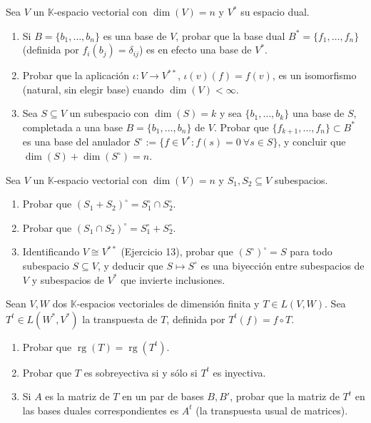 \documentclass{article}
\newcommand{\K}{\mathbb{K}}
\DeclareMathOperator{\rg}{rg}
\DeclareMathOperator{\dimm}{dim}
\theoremstyle{plain}
\theoremstyle{definition}
\theoremstyle{remark}
\newenvironment{ejercicio}[1]{\begin{trivlist}
\item[\hskip \labelsep {\bfseries Ejercicio}\hskip \labelsep {\bfseries #1.}]}{\end{trivlist}}
\begin{document}
\begin{ejercicio}{13}
    Sea \(V\) un \(\K\)-espacio vectorial con \(\dimm(V) = n\) y \(V^*\) su espacio dual.
    \begin{enumerate}
        \item Si \(B = \{b_1,\ldots,b_n\}\) es una base de \(V\), probar que la base dual \(B^* = \{f_1,\ldots,f_n\}\) (definida por \(f_i(b_j) = \delta_{ij}\)) es en efecto una base de \(V^*\).
        \item Probar que la aplicación \(\iota: V \to V^{**}\), \(\iota(v)(f) = f(v)\), es un isomorfismo (natural, sin elegir base) cuando \(\dimm(V) < \infty\).
        \item Sea \(S \subseteq V\) un subespacio con \(\dimm(S) = k\) y sea \(\{b_1,\ldots,b_k\}\) una base de \(S\), completada a una base \(B = \{b_1,\ldots,b_n\}\) de \(V\). Probar que \(\{f_{k+1},\ldots,f_n\} \subset B^*\) es una base del anulador \(S^\circ := \{f \in V^* : f(s)=0\ \forall s \in S\}\), y concluir que \(\dimm(S)+\dimm(S^\circ) = n\).
    \end{enumerate}
\end{ejercicio}

\begin{ejercicio}{14}
    Sea \(V\) un \(\K\)-espacio vectorial con \(\dimm(V) = n\) y \(S_1, S_2 \subseteq V\) subespacios.
    \begin{enumerate}
        \item Probar que \((S_1+S_2)^\circ = S_1^\circ \cap S_2^\circ\).
        \item Probar que \((S_1 \cap S_2)^\circ = S_1^\circ + S_2^\circ\).
        \item Identificando \(V \cong V^{**}\) (Ejercicio 13), probar que \((S^\circ)^\circ = S\) para todo subespacio \(S \subseteq V\), y deducir que \(S \mapsto S^\circ\) es una biyección entre subespacios de \(V\) y subespacios de \(V^*\) que invierte inclusiones.
    \end{enumerate}
\end{ejercicio}

\begin{ejercicio}{15}
    Sean \(V, W\) dos \(\K\)-espacios vectoriales de dimensión finita y \(T \in L(V,W)\). Sea \(T^t \in L(W^*,V^*)\) la transpuesta de \(T\), definida por \(T^t(f) = f \circ T\).
    \begin{enumerate}
        \item Probar que \(\rg(T) = \rg(T^t)\).
        \item Probar que \(T\) es sobreyectiva si y sólo si \(T^t\) es inyectiva.
        \item Si \(A\) es la matriz de \(T\) en un par de bases \(B, B'\), probar que la matriz de \(T^t\) en las bases duales correspondientes es \(A^t\) (la transpuesta usual de matrices).
    \end{enumerate}
\end{ejercicio}
\end{document}
